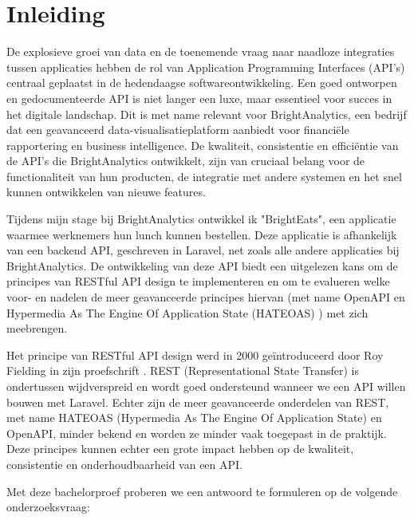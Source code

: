 
\section{Inleiding}%
\label{sec:inleiding}
De explosieve groei van data en de toenemende vraag naar naadloze integraties tussen applicaties hebben de rol van Application Programming Interfaces (API's) centraal geplaatst in de hedendaagse softwareontwikkeling. Een goed ontworpen en gedocumenteerde API is niet langer een luxe, maar essentieel voor succes in het digitale landschap. Dit is met name relevant voor BrightAnalytics, een bedrijf dat een geavanceerd data-visualisatieplatform aanbiedt voor financiële rapportering en business intelligence. De kwaliteit, consistentie en efficiëntie van de API's die BrightAnalytics ontwikkelt, zijn van cruciaal belang voor de functionaliteit van hun producten, de integratie met andere systemen en het snel kunnen ontwikkelen van nieuwe features.

\bigskip

Tijdens mijn stage bij BrightAnalytics ontwikkel ik "BrightEats", een applicatie waarmee werknemers hun lunch kunnen bestellen. Deze applicatie is afhankelijk van een backend API, geschreven in Laravel, net zoals alle andere applicaties bij BrightAnalytics. De ontwikkeling van deze API biedt een uitgelezen kans om de principes van RESTful API design te implementeren en om te evalueren welke voor- en nadelen de meer geavanceerde principes hiervan (met name OpenAPI en Hypermedia As The Engine Of Application State (HATEOAS) ) met zich meebrengen.

\bigskip

Het principe van RESTful API design werd in 2000 geïntroduceerd door Roy Fielding in zijn proefschrift \autocite{Fielding2000}. REST (Representational State Transfer) is ondertussen wijdverspreid en wordt goed ondersteund wanneer we een API willen bouwen met Laravel. Echter zijn de meer geavanceerde onderdelen van REST, met name HATEOAS (Hypermedia As The Engine Of Application State) en OpenAPI, minder bekend en worden ze minder vaak toegepast in de praktijk. Deze principes kunnen echter een grote impact hebben op de kwaliteit, consistentie en onderhoudbaarheid van een API.

\bigskip

Met deze bachelorproef proberen we een antwoord te formuleren op de volgende onderzoeksvraag:

